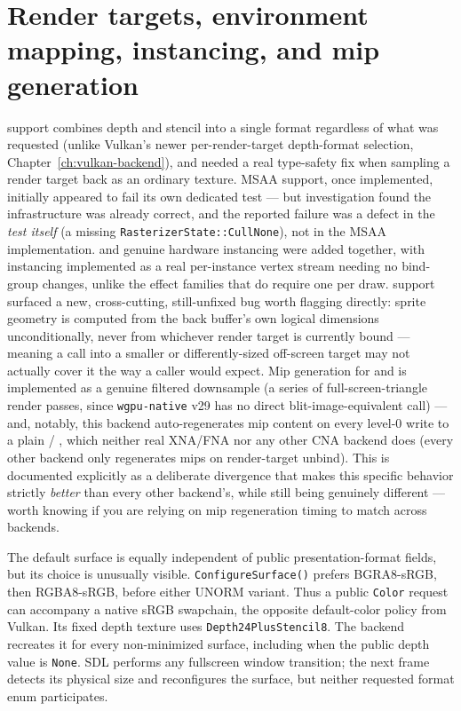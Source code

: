 \section{Render targets, environment mapping, instancing, and mip generation}

 support combines depth and stencil into a single format regardless
of what was requested (unlike Vulkan's newer per-render-target depth-format selection,
Chapter~\ref{ch:vulkan-backend}),
and needed a real type-safety fix when sampling a render target back as an ordinary texture.
MSAA support, once implemented, initially appeared to fail its own dedicated test --- but
investigation found the infrastructure was already correct, and the reported failure was a
defect in the \emph{test itself} (a missing \texttt{RasterizerState::CullNone}), not in the
MSAA implementation.  and genuine hardware instancing were
added together, with instancing implemented as a real per-instance vertex stream needing no
bind-group changes, unlike the effect families that do require one per draw.
 support surfaced a new, cross-cutting, still-unfixed bug worth
flagging directly: sprite geometry is computed from the back buffer's own logical dimensions
unconditionally, never from whichever render target is currently bound --- meaning a
 call into a smaller or differently-sized off-screen target may
not actually cover it the way a caller would expect. Mip generation for 
and  is implemented as a genuine filtered downsample (a series of
full-screen-triangle render passes, since \texttt{wgpu-native} v29 has no direct
blit-image-equivalent call) --- and, notably, this backend auto-regenerates mip content on
every level-0 write to a plain  / , which neither real
XNA/FNA nor any other CNA backend does (every other backend only regenerates mips on
render-target unbind). This is documented explicitly as a deliberate divergence that makes
this specific behavior strictly \emph{better} than every other backend's, while still being
genuinely different --- worth knowing if you are relying on mip regeneration timing to match
across backends.

\begin{sourcenote}
The default surface is equally independent of public presentation-format fields, but its
choice is unusually visible. \texttt{ConfigureSurface()} prefers BGRA8-sRGB, then
RGBA8-sRGB, before either UNORM variant. Thus a public \texttt{Color} request can accompany
a native sRGB swapchain, the opposite default-color policy from Vulkan. Its fixed depth
texture uses \texttt{Depth24PlusStencil8}. The backend recreates it for every non-minimized
surface, including when the public depth value is \texttt{None}. SDL performs any fullscreen window transition;
the next frame detects its physical size and reconfigures the surface, but neither requested
format enum participates.
\end{sourcenote}

